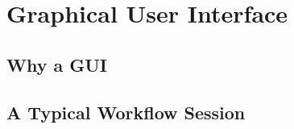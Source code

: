\chapter{Graphical User Interface}
\label{chap:gui}


\section{Why a GUI}
\label{sec:gui-motivation}


\section{A Typical Workflow Session}
\label{sec:gui-workflow}

